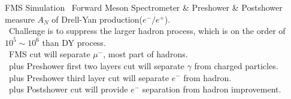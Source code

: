 \documentclass[
mode=present,
nohandoutpagebreaks,
nohandoutframes,
size=12pt,
style=huskyinverse,
hlsections,
slidesnotes,
pauseslide,
clock,
]{powerdot}
\begin{document}
\begin{slide}{FMS Simulation}
    \textcolor{red}{}\ Forward Meson Spectrometer \& Preshower \& Postshower measure $A_N$ of Drell-Yan production($e^{-}/e^{+}$). \\
    \vspace{0.3cm}
    \textcolor{green}{}\ Challenge is to suppress the larger hadron process, which is on the order of $10^5\sim 10^6$ than DY process. \\
    \vspace{0.3cm}
    \textcolor{red}{}\ FMS cut will separate $\mu^{-}$, most part of hadrons. \\
    \vspace{0.3cm}
    \textcolor{green}{}\ plus Preshower first two layers cut will separate $\gamma$ from charged particles. \\
    \vspace{0.3cm}
    \textcolor{red}{}\ plus Preshower third layer cut will separate $e^{-}$ from hadron. \\
    \vspace{0.3cm}
    \textcolor{green}{}\ plus Postshower cut will provide $e^{-}$ separation from hadron improvement. 
\end{slide}
\end{document}
